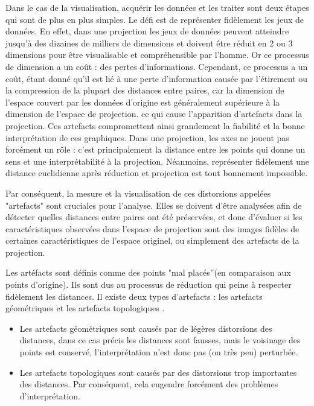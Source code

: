 Dans le cas de la visualisation, acquérir les données et les traiter sont deux étapes qui sont de plus en plus simples. Le défi est de représenter fidèlement les jeux de données. En effet, dans une projection les jeux de données peuvent atteindre jusqu’à des dizaines de milliers de dimensions et doivent être réduit en 2 ou 3 dimensions pour être visualisable et compréhensible par l’homme. Or ce processus de dimension a un coût : des pertes d’informations.
Cependant, ce processus a un coût, étant donné qu'il est lié à une perte d'information causée par l'étirement ou la compression de la plupart des distances entre paires, 
car la dimension de l'espace couvert par les données d'origine est généralement supérieure à la dimension de l'espace de projection.  ce qui cause l’apparition d’artefacts dans la projection. Ces artefacts compromettent ainsi grandement la fiabilité et la bonne interprétation de ces graphiques\cite{scarlet}. 
Dans une projection, les axes ne jouent pas forcément un rôle : c’est principalement la distance entre les points qui donne un sens et une interprétabilité à la projection\cite{koffka1997PsychoGesttalt}. 
Néanmoins, représenter fidèlement une distance euclidienne après réduction et projection est tout bonnement impossible. 

Par conséquent, la mesure et la visualisation de ces distorsions appelées "artefacts" sont cruciales pour l'analyse. Elles se doivent d'être analysées afin de détecter quelles distances entre paires ont été préservées, 
et donc d'évaluer si les caractéristiques observées dans l'espace de projection sont des images fidèles de certaines caractéristiques de l'espace originel, ou simplement des artefacts de la projection.
\medskip

Les artéfacts sont définis comme des points "mal placés”(en comparaison aux points d’origine). Ils sont dus au processus de réduction qui peine à respecter fidèlement les distances. Il existe deux types d’artefacts : les artefacts géométriques et les artefacts topologiques \cite{HeulotAnEvaluation}.
\begin{itemize}
    \item Les artefacts géométriques sont causés par de légères distorsions des distances, dans ce cas précis les distances sont fausses, mais le voisinage des points est conservé,  l’interprétation n’est donc pas (ou très peu) perturbée.
    \item Les artefacts topologiques sont causés par des distorsions trop importantes des distances. Par conséquent, cela engendre forcément des problèmes d’interprétation.
\end{itemize}

